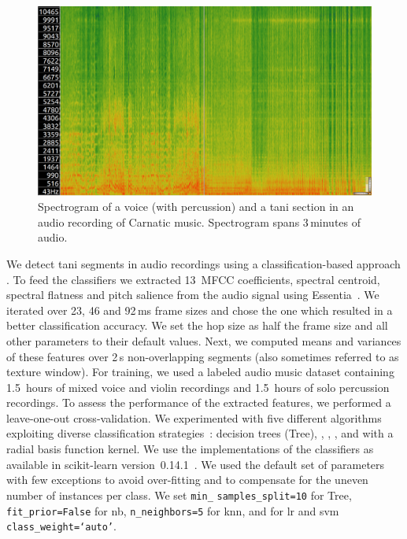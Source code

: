 {\begin{figure}
	\begin{center}
		\includegraphics[width=\figSizeEighty]{ch05_preprocessing/figures/spectrogramTani.png}
	\end{center}
	\caption{Spectrogram of a voice (with percussion) and a \gls{tani} section in an audio recording of Carnatic music. Spectrogram spans 3\,minutes of audio.}
	\label{fig:spectrogram_of_tani_segment}
\end{figure}

We detect \gls{tani} segments in audio recordings using a classification-based approach . To feed the classifiers we extracted 13~MFCC coefficients, spectral centroid, spectral flatness and pitch salience \citep{slaney1998auditory} from the audio signal using Essentia~\citep{essentia}. We iterated over 23, 46 and 92\,ms frame sizes and chose the one which resulted in a better classification accuracy. We set the hop size as half the frame size and all other parameters to their default values. Next, we computed means and variances of these features over 2\,s non-overlapping segments (also sometimes referred to as texture window). For training, we used a labeled audio music dataset containing 1.5~hours of mixed voice and violin recordings and 1.5~hours of solo percussion recordings. To assess the performance of the extracted features, we performed a leave-one-out cross-validation. We experimented with five different algorithms exploiting diverse classification strategies~\cite{Hastie09BOOK}: decision trees (Tree), , , , and  with a radial basis function kernel. We use the implementations of the classifiers as available in scikit-learn version~0.14.1~\citep{scikitlearn}. We used the default set of parameters with few exceptions to avoid over-fitting and to compensate for the uneven number of instances per class. We set \texttt{min\_} \texttt{samples\_split=10} for Tree, \texttt{fit\_prior=False} for \gls{nb}, \texttt{n\_neighbors=5} for \gls{knn}, and for \gls{lr} and \gls{svm} \texttt{class\_weight=`auto'}. 

}
